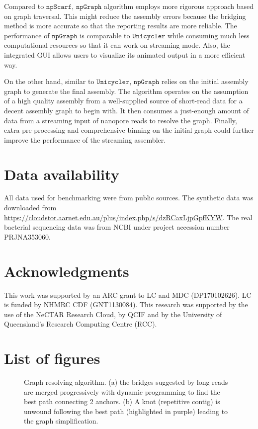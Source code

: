 \documentclass[10pt,letterpaper]{article}
\newcommand{\npscarf}{$\mathtt{npScarf}$}
\newcommand{\npgraph}{$\mathtt{npGraph}$}
\newcommand{\unicycler}{$\mathtt{Unicycler}$}
\begin{document}
Compared to \npscarf, \npgraph{} algorithm employs more rigorous approach based on graph traversal. This might reduce the assembly errors because the bridging method is more accurate so that the reporting results are more reliable.
The performance of \npgraph{} is comparable to \unicycler{} while consuming much less computational resources so that it can work on streaming mode. 
Also, the integrated GUI allows users to visualize its animated output in a  more efficient way.

On the other hand, similar to \unicycler{}, \npgraph{} relies on the initial assembly graph to generate the final assembly. The algorithm operates on the assumption of a high quality assembly from a well-supplied source of short-read data for a decent assembly graph to begin with.
It then consumes a just-enough amount of data from a streaming input of nanopore reads to resolve the graph. 
Finally, extra pre-processing and comprehensive binning on the initial graph could further improve the performance of the streaming assembler.

\section*{Data availability}
All data used for benchmarking were from public sources. The synthetic data was downloaded from \url{https://cloudstor.aarnet.edu.au/plus/index.php/s/dzRCaxLjpGpfKYW}. The real bacterial sequencing data was from NCBI under project accession number PRJNA353060.

\section*{Acknowledgments}
This work was supported by an ARC grant to LC and MDC (DP170102626).  LC is funded by NHMRC CDF (GNT1130084).  This research was supported by the use of the NeCTAR Research Cloud, by QCIF and by the University of Queensland’s Research Computing Centre (RCC).

\nolinenumbers
\pagebreak
\section*{List of figures}

\begin{figure}[!hpt]
\centering
\caption{Graph resolving algorithm. (a) the bridges suggested by long reads are merged progressively with dynamic programming to find the best path connecting 2 anchors. (b) A knot (repetitive contig) is unwound following the best path (highlighted in purple) leading to the graph simplification.}
\label{figure:npgraph_pipeline}
\end{figure}
\end{document}
